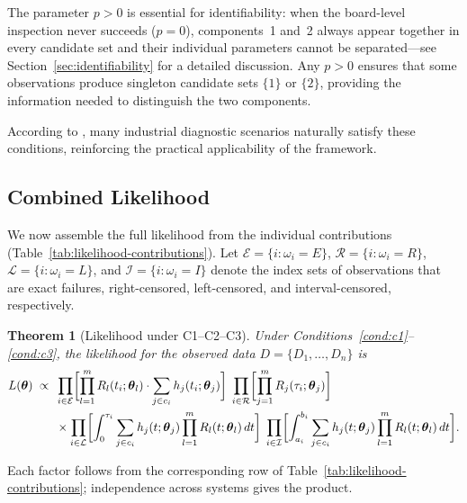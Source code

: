 \documentclass[11pt]{article}
\theoremstyle{definition}
\theoremstyle{plain}
\newtheorem{theorem}{Theorem}
\renewcommand{\v}[1]{\boldsymbol{#1}}
\newcommand{\btheta}{\v{\theta}}
\begin{document}
The parameter $p > 0$ is essential for identifiability: when the
board-level inspection never succeeds ($p = 0$), components~1 and~2
always appear together in every candidate set and their individual
parameters cannot be separated---see
Section~\ref{sec:identifiability} for a detailed discussion.
Any $p > 0$ ensures that some observations produce singleton candidate
sets $\{1\}$ or $\{2\}$, providing the information needed to
distinguish the two components.

According to \citet{guess1991}, many industrial diagnostic scenarios
naturally satisfy these conditions, reinforcing the practical
applicability of the framework.

\subsection{Combined Likelihood}
\label{sec:combined-likelihood}

We now assemble the full likelihood from the individual contributions
(Table~\ref{tab:likelihood-contributions}).
Let $\mathcal{E} = \{i : \omega_i = E\}$,
$\mathcal{R} = \{i : \omega_i = R\}$,
$\mathcal{L} = \{i : \omega_i = L\}$, and
$\mathcal{I} = \{i : \omega_i = I\}$ denote the
index sets of observations that are exact failures, right-censored,
left-censored, and interval-censored, respectively.

\begin{theorem}[Likelihood under C1--C2--C3]
\label{thm:likelihood-contribution}
Under Conditions~\ref{cond:c1}--\ref{cond:c3}, the likelihood for the
observed data $D = \{D_1, \ldots, D_n\}$ is
\begin{align}
\label{eq:combined-likelihood}
    L(\btheta) \;\propto\;\;
    &\prod_{i \in \mathcal{E}}
        \biggl[\prod_{l=1}^m R_l(t_i; \v{\theta}_l)
        \cdot \sum_{j \in c_i} h_j(t_i; \v{\theta}_j)\biggr]
    \;\prod_{i \in \mathcal{R}}
        \biggl[\prod_{j=1}^m R_j(\tau_i; \v{\theta}_j)\biggr]
        \notag \\
    &\times
    \prod_{i \in \mathcal{L}}
        \biggl[\int_0^{\tau_i}
        \sum_{j \in c_i} h_j(t; \v{\theta}_j)
        \prod_{l=1}^m R_l(t; \v{\theta}_l) \, dt\biggr]
    \;\prod_{i \in \mathcal{I}}
        \biggl[\int_{a_i}^{b_i}
        \sum_{j \in c_i} h_j(t; \v{\theta}_j)
        \prod_{l=1}^m R_l(t; \v{\theta}_l) \, dt\biggr].
\end{align}
\end{theorem}

Each factor follows from the corresponding row of
Table~\ref{tab:likelihood-contributions}; independence across systems
gives the product.
\end{document}
